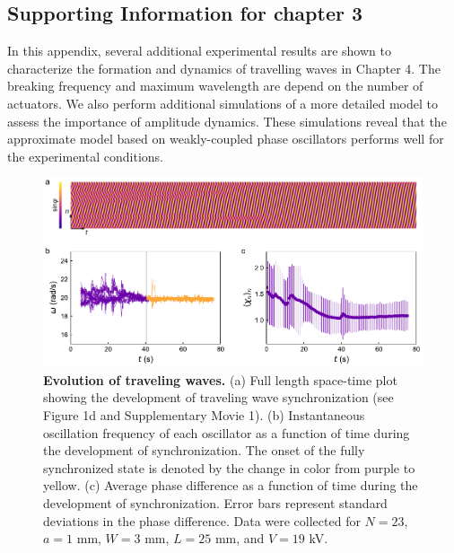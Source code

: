 \begin{appendices}



\chapter{Supporting Information for chapter 3}

In this appendix, several additional experimental results are shown to characterize the formation and dynamics of travelling waves in Chapter 4. The breaking frequency and maximum wavelength are depend on the number of actuators. We also perform additional simulations of a more detailed model to assess the importance  of  amplitude  dynamics.  These simulations  reveal  that  the  approximate  model  based  on  weakly-coupled  phase  oscillators performs well for the experimental conditions.

\begin{figure}[p]
    \centering
    \includegraphics{figures/A2_SI1-v3.pdf}
    \caption{\textbf{Evolution of traveling waves.} (a) Full length space-time plot showing the development of traveling wave synchronization (see Figure 1d and Supplementary Movie 1). (b) Instantaneous oscillation frequency of each oscillator as a function of time during the development of synchronization. The onset of the fully synchronized state is denoted by the change in color from purple to yellow. (c) Average phase difference as a function of time during the development of synchronization. Error bars represent standard deviations in the phase difference. Data were collected for $N=23$, $a=1$ mm, $W=3$ mm, $L=25$ mm, and $V=19$ kV.}
    \label{fig:SI1}
\end{figure}



\end{appendices}
